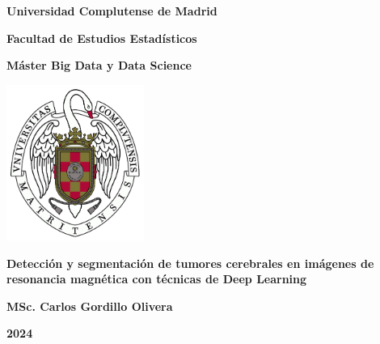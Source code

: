 \documentclass[12pt, oneside]{book}
\newcommand{\university}{Universidad Complutense de Madrid}
\newcommand{\facultad}{Facultad de Estudios Estadísticos}
\newcommand{\master}{Máster Big Data y Data Science}
\newcommand{\thesisTitle}{Detección y segmentación de tumores cerebrales en imágenes de resonancia magnética con técnicas de Deep Learning}
\newcommand{\authorName}{MSc. Carlos Gordillo Olivera}
\newcommand{\thesisYear}{2024}
\begin{document}
\begin{titlepage}
    \centering
    
    {\LARGE\textbf{\university}\par}
        {\Large\textbf{\facultad}\par}
         {\Large\textbf{\master}\par}
    \vspace{1cm}
    
        \includegraphics[width=4.5cm]{images/UCM-Logo.png}
    \vspace*{1cm}
    
    {\huge\textbf{\thesisTitle}\par}
    \vspace{7cm}
    
    {\Large\textbf{\authorName}\par}
    \vfill
    
    {\Large\textbf{\thesisYear}\par}
    
\end{titlepage}

\tableofcontents











\end{document}

